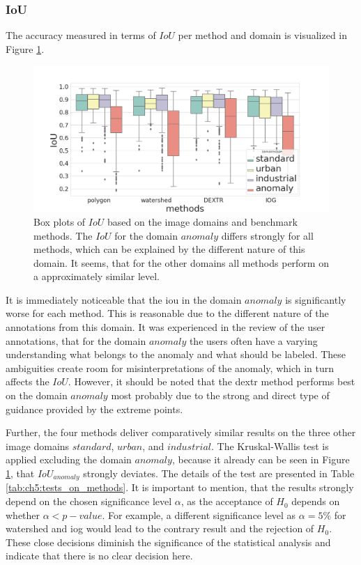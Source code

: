 \subsubsection{IoU}
The accuracy measured in terms of $ IoU $ per method and domain is visualized in Figure \ref{fig:ch5:sec2:methods_over_domain_iou}. %
\begin{figure}[h!]
	\centering
	\includegraphics[width=\textwidth]{figures/chap52_iou_methods_over_domains_boxplot.png}
	\caption [Box plots of image domains and methods on  $ IoU $]{
		Box plots of $ IoU $ based on the image domains and benchmark methods.
		The $ IoU $ for the domain $ anomaly $ differs strongly for all methods, which can be explained by the different nature of this domain.
		It seems, that for the other domains all methods perform on a approximately similar level.
	}\label{fig:ch5:sec2:methods_over_domain_iou}
\end{figure}
It is immediately noticeable that the \gls{iou} in the domain $ anomaly $ is significantly worse for each method.
This is reasonable due to the different nature of the annotations from this domain.
It was experienced in the review of the user annotations, that for the domain $ anomaly $ the users often have a varying understanding what belongs to the anomaly and what should be labeled.
These ambiguities create room for misinterpretations of the anomaly, which in turn affects the $ IoU $.
However, it should be noted that the \gls{dextr} method performs best on the domain $ anomaly $ most probably due to the strong and direct type of guidance provided by the extreme points.

Further, the four methods deliver comparatively similar results on the three other image domains $ standard $, $ urban $, and $ industrial $.
The Kruskal-Wallis test is applied excluding the domain $ anomaly $, because it already can be seen in Figure \ref{fig:ch5:sec2:methods_over_domain_iou}, that $ IoU_{anomaly} $ strongly deviates.
The details of the test are presented in Table \ref{tab:ch5:tests_on_methods}.
It is important to mention, that the results strongly depend on the chosen significance level $ \alpha $, as the acceptance of $ H_0 $ depends on whether $ \alpha < p-value $.
For example, a different significance level as $ \alpha = 5\% $ for watershed and \gls{iog} would lead to the contrary result and the rejection of $ H_0 $.
These close decisions diminish the significance of the statistical analysis and indicate that there is no clear decision here.

